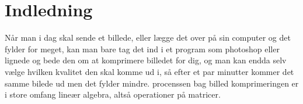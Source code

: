 \chapter{Indledning}

Når man i dag skal sende et billede, eller lægge det over på sin computer og det fylder for meget, kan man bare tag det ind i et program som photoshop eller lignede og bede den om at komprimere billedet for dig, og man kan endda selv vælge hvilken kvalitet den skal komme ud i, så efter et par minutter kommer det samme bilede ud men det fylder mindre. procenssen bag billed komprimeringen er i store omfang lineær algebra, altså operationer på matricer. 

